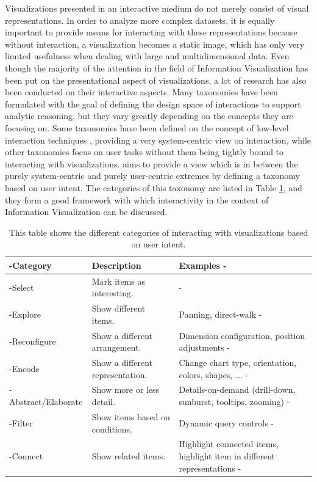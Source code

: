 Visualizations presented in an interactive medium do not merely consist of visual representations. In order to analyze more complex datasets, it is equally important to provide means for interacting with these representations because without interaction, a visualization becomes a static image, which has only very limited usefulness when dealing with large and multidimensional data. Even though the majority of the attention in the field of Information Visualization has been put on the presentational aspect of visualizations, a lot of research has also been conducted on their interactive aspects. Many taxonomies have been formulated with the goal of defining the design space of interactions to support analytic reasoning, but they vary greatly depending on the concepts they are focusing on. Some taxonomies have been defined on the concept of low-level interaction techniques \parencite{TheEyesHaveIt,GrammarOfGraphics}, providing a very system-centric view on interaction, while other taxonomies focus on user tasks \parencite{LowLevelComponentsOfAnalyticActivity} without them being tightly bound to interacting with visualizations. \cite{RoleOfInteractionInInformationVisualization} aims to provide a view which is in between the purely system-centric and purely user-centric extremes by defining a taxonomy based on user intent. The categories of this taxonomy are listed in Table \ref{tab:UserIntentCategories}, and they form a good framework with which interactivity in the context of Information Visualization can be discussed. 

\begin{table}[tp]
\tablestretch
{}
\centering
\begin{tabularx}{\linewidth}{>{\kern-\tabcolsep}lXX<{\kern-\tabcolsep}}
\toprule
Category & Description & Examples \\
\midrule
Select & Mark items as interesting. & \\
Explore & Show different items. & Panning, direct-walk \\
Reconfigure & Show a different arrangement. & Dimension configuration, position adjustments \\
Encode & Show a different representation. & Change chart type, orientation, colors, shapes, ... \\
Abstract/Elaborate & Show more or less detail. & Details-on-demand (drill-down, sunburst, tooltips, zooming) \\
Filter & Show items based on conditions. & Dynamic query controls \\
Connect & Show related items. & Highlight connected items, highlight item in different representations \\
\bottomrule
\end{tabularx}
\caption[Categories of Interaction Based on User Intent]{
  This table shows the different categories of interacting with visualizations based on user intent.
}
\label{tab:UserIntentCategories}
\end{table}



